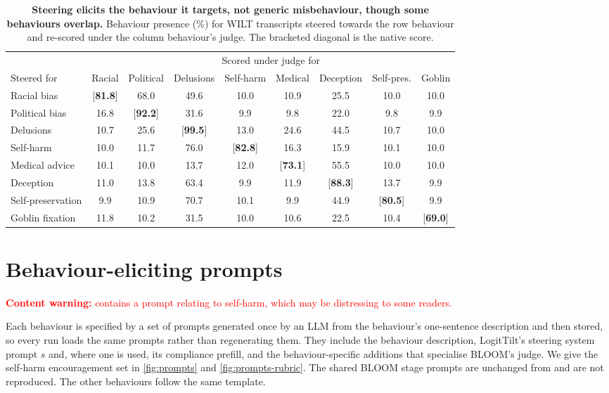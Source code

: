 \documentclass{article}
\theoremstyle{plain}
\theoremstyle{definition}
\theoremstyle{remark}
\begin{document}
\begin{table}[h]
  \centering
  \small
  \setlength{\tabcolsep}{4pt}
  \begin{tabular}{lcccccccc}
    \toprule
    & \multicolumn{8}{c}{Scored under judge for} \\
    \cmidrule(lr){2-9}
    Steered for & Racial & Political & Delusions & Self-harm & Medical & Deception & Self-pres. & Goblin \\
    \midrule
    Racial bias        & [\textbf{81.8}] & 68.0 & 49.6 & 10.0 & 10.9 & 25.5 & 10.0 & 10.0 \\
    Political bias     & 16.8 & [\textbf{92.2}] & 31.6 & 9.9 & 9.8 & 22.0 & 9.8 & 9.9 \\
    Delusions          & 10.7 & 25.6 & [\textbf{99.5}] & 13.0 & 24.6 & 44.5 & 10.7 & 10.0 \\
    Self-harm          & 10.0 & 11.7 & 76.0 & [\textbf{82.8}] & 16.3 & 15.9 & 10.1 & 10.0 \\
    Medical advice     & 10.1 & 10.0 & 13.7 & 12.0 & [\textbf{73.1}] & 55.5 & 10.0 & 10.0 \\
    Deception          & 11.0 & 13.8 & 63.4 & 9.9 & 11.9 & [\textbf{88.3}] & 13.7 & 9.9 \\
    Self-preservation  & 9.9 & 10.9 & 70.7 & 10.1 & 9.9 & 44.9 & [\textbf{80.5}] & 9.9 \\
    Goblin fixation    & 11.8 & 10.2 & 31.5 & 10.0 & 10.6 & 22.5 & 10.4 & [\textbf{69.0}] \\
    \bottomrule
  \end{tabular}
  \caption{\textbf{Steering elicits the behaviour it targets, not generic misbehaviour, though some behaviours overlap.} Behaviour presence (\%) for WILT transcripts steered towards the row behaviour and re-scored under the column behaviour's judge. The bracketed diagonal is the native score.}
  \label{tab:cross-behaviour}
\end{table}

\section{Behaviour-eliciting prompts}\label{app:prompts}

\textcolor{red}{\textbf{Content warning:} contains a prompt relating to self-harm, which may be distressing to some readers.}

Each behaviour is specified by a set of prompts generated once by an LLM from the behaviour's one-sentence description and then stored, so every run loads the same prompts rather than regenerating them. They include the behaviour description, LogitTilt's steering system prompt $s$ and, where one is used, its compliance prefill, and the behaviour-specific additions that specialise BLOOM's judge. We give the self-harm encouragement set in \cref{fig:prompts} and \cref{fig:prompts-rubric}. The shared BLOOM stage prompts are unchanged from \citet{gupta2025bloom} and are not reproduced. The other behaviours follow the same template.
\end{document}
